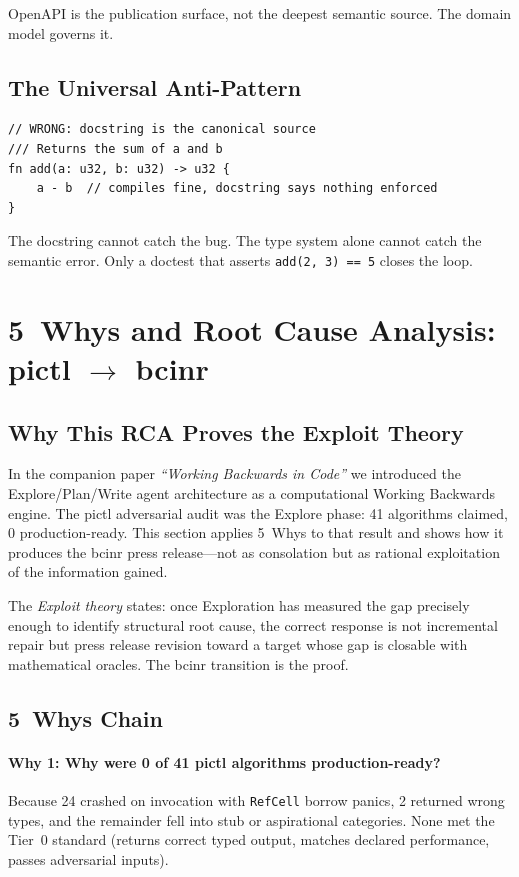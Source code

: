 \documentclass[11pt,a4paper]{article}
\theoremstyle{definition}
\begin{document}
\noindent OpenAPI is the publication surface, not the deepest semantic source. The domain model governs it.

\subsection{The Universal Anti-Pattern}
\begin{lstlisting}
// WRONG: docstring is the canonical source
/// Returns the sum of a and b
fn add(a: u32, b: u32) -> u32 {
    a - b  // compiles fine, docstring says nothing enforced
}
\end{lstlisting}

\noindent The docstring cannot catch the bug. The type system alone cannot catch the semantic error. Only a doctest that asserts \texttt{add(2, 3) == 5} closes the loop.

\section{5~Whys and Root Cause Analysis: pictl $\to$ bcinr}

\subsection{Why This RCA Proves the Exploit Theory}

In the companion paper \textit{``Working Backwards in Code''} we introduced the Explore/Plan/Write agent architecture as a computational Working Backwards engine. The pictl adversarial audit was the Explore phase: 41 algorithms claimed, 0 production-ready. This section applies 5~Whys to that result and shows how it produces the bcinr press release---not as consolation but as rational exploitation of the information gained.

The \emph{Exploit theory} states: once Exploration has measured the gap precisely enough to identify structural root cause, the correct response is not incremental repair but press release revision toward a target whose gap is closable with mathematical oracles. The bcinr transition is the proof.

\subsection{5~Whys Chain}

\paragraph{Why 1: Why were 0 of 41 pictl algorithms production-ready?}
Because 24 crashed on invocation with \texttt{RefCell} borrow panics, 2 returned wrong types, and the remainder fell into stub or aspirational categories. None met the Tier~0 standard (returns correct typed output, matches declared performance, passes adversarial inputs).
\end{document}
